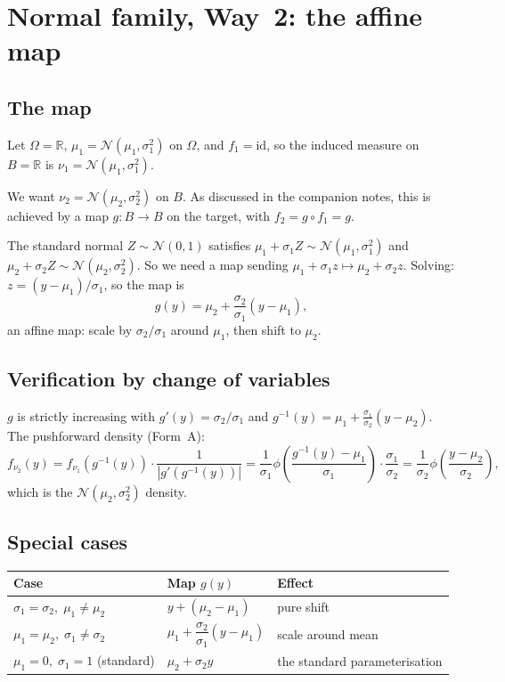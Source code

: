 \documentclass[11pt,a4paper]{article}
\newcommand{\N}{\mathcal{N}}
\newcommand{\R}{\mathbb{R}}
\begin{document}
\section{Normal family, Way~2: the affine map}
\label{sec:normal-way2}

\subsection{The map}

Let $\Omega=\R$, $\mu_1=\N(\mu_1,\sigma_1^2)$ on $\Omega$, and $f_1=\mathrm{id}$, so the
induced measure on $B=\R$ is $\nu_1=\N(\mu_1,\sigma_1^2)$.

We want $\nu_2=\N(\mu_2,\sigma_2^2)$ on $B$.  As discussed in the companion notes, this is
achieved by a map $g:B\to B$ on the target, with $f_2=g\circ f_1=g$.

The standard normal $Z\sim\N(0,1)$ satisfies $\mu_1+\sigma_1 Z\sim\N(\mu_1,\sigma_1^2)$ and
$\mu_2+\sigma_2 Z\sim\N(\mu_2,\sigma_2^2)$.
So we need a map sending $\mu_1+\sigma_1 z\mapsto\mu_2+\sigma_2 z$.
Solving: $z=(y-\mu_1)/\sigma_1$, so the map is
\[
  g(y)=\mu_2+\frac{\sigma_2}{\sigma_1}(y-\mu_1),
\]
an affine map: scale by $\sigma_2/\sigma_1$ around $\mu_1$, then shift to $\mu_2$.

\subsection{Verification by change of variables}

$g$ is strictly increasing with $g'(y)=\sigma_2/\sigma_1$ and
$g^{-1}(y)=\mu_1+\frac{\sigma_1}{\sigma_2}(y-\mu_2)$.  The pushforward density (Form~A):
\[
  f_{\nu_2}(y)
  =f_{\nu_1}(g^{-1}(y))\cdot\frac{1}{|g'(g^{-1}(y))|}
  =\frac{1}{\sigma_1}\phi\!\left(\frac{g^{-1}(y)-\mu_1}{\sigma_1}\right)\cdot\frac{\sigma_1}{\sigma_2}
  =\frac{1}{\sigma_2}\phi\!\left(\frac{y-\mu_2}{\sigma_2}\right),
\]
which is the $\N(\mu_2,\sigma_2^2)$ density. \checkmark

\subsection{Special cases}

\begin{center}
\begin{tabular}{lll}
\toprule
\textbf{Case} & \textbf{Map }$g(y)$ & \textbf{Effect} \\
\midrule
$\sigma_1=\sigma_2,\;\mu_1\ne\mu_2$ & $y+(\mu_2-\mu_1)$ & pure shift \\
$\mu_1=\mu_2,\;\sigma_1\ne\sigma_2$  & $\mu_1+\dfrac{\sigma_2}{\sigma_1}(y-\mu_1)$ & scale around mean \\
$\mu_1=0,\;\sigma_1=1$ (standard)   & $\mu_2+\sigma_2 y$ & the standard parameterisation \\
\bottomrule
\end{tabular}
\end{center}
\end{document}
